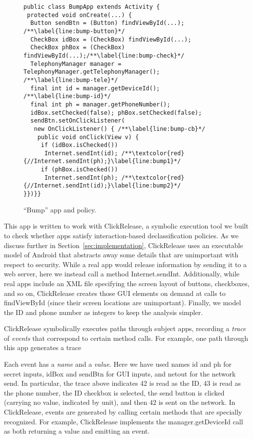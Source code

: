\documentclass{llncs}
\newcommand{\code}[1]{\textsf{#1}} \newcommand{\bcode}[1]{\texttt{#1}}
\newcommand{\toolname}{ClickRelease\xspace}
\begin{document}
\begin{figure}[t]
\centering
\begin{lstlisting}[name=Ex]
public class BumpApp extends Activity {
 protected void onCreate(...) {
  Button sendBtn = (Button) findViewById(...); /**\label{line:bump-button}*/
  CheckBox idBox = (CheckBox) findViewById(...);
  CheckBox phBox = (CheckBox) findViewById(...);/**\label{line:bump-check}*/
  TelephonyManager manager = TelephonyManager.getTelephonyManager(); /**\label{line:bump-tele}*/
  final int id = manager.getDeviceId(); /**\label{line:bump-id}*/
  final int ph = manager.getPhoneNumber();
  idBox.setChecked(false); phBox.setChecked(false);
  sendBtn.setOnClickListener(
   new OnClickListener() { /**\label{line:bump-cb}*/
    public void onClick(View v) {
     if (idBox.isChecked())
      Internet.sendInt(id); /**\textcolor{red}{//Internet.sendInt(ph);}\label{line:bump1}*/
     if (phBox.isChecked())
      Internet.sendInt(ph); /**\textcolor{red}{//Internet.sendInt(id);}\label{line:bump2}*/
}})}}
  \end{lstlisting}

\caption{``Bump'' app and policy.}
\label{fig:app-bump}
\end{figure}
 
This app is written to work with \toolname{}, a symbolic execution tool we built to check
whether apps satisfy interaction-based declassification policies. As we
discuss further in Section~\ref{sec:implementation}, \toolname{} uses an
executable model of Android that abstracts away some details that are
unimportant with respect to security. While a real app would release
information by sending it to a web server, here we instead call a
method \code{Internet.sendInt}. Additionally, while real apps
include an XML file specifying the screen layout of buttons,
checkboxes, and so on, \toolname{} creates those GUI elements
on demand at calls to \code{findViewById} (since their screen locations are
unimportant). Finally, we model the ID and phone number as
integers to keep the analysis simpler.

\toolname{} symbolically executes paths through subject apps, recording a
\emph{trace} of \emph{events} that correspond to certain method calls.
For example, one path through this app generates a trace

Each event has a \emph{name} and a \emph{value}. Here we have used
names \code{id} and \code{ph} for secret inputs, \code{idBox} and
\code{sendBtn} for GUI inputs, and \code{netout} for the network
send.  In particular, the trace above indicates 42 is read as the ID,
43 is read as the phone number, the ID checkbox is selected, the send
button is clicked (carrying no value, indicated by
\code{unit}), and then 42 is sent on the network. In \toolname{},
events are generated by calling certain methods that are specially
recognized. For example, \toolname{} implements the
\code{manager.getDeviceId} call as both returning a value and emitting
an event.
\end{document}
